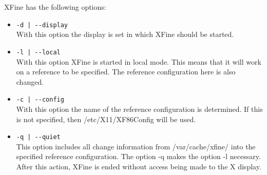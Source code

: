 XFine has the following options:
\begin{itemize}
\item \verb+-d | --display+\\
      With this option the display is set in which 
      XFine should be started.
\item \verb+-l | --local+\\
      With this option XFine is started in local mode.
      This means that it will work on a reference to be specified. The
      reference configuration here is also changed.
\item \verb+-c | --config+\\
      With this option the name of the reference configuration is determined. 
      If this is not specified, then /etc/X11/XF86Config will be used.
\item \verb+-q | --quiet+\\
      This option includes all change information from 
      /var/cache/xfine/ into the specified reference configuration. The
      option  -q makes the option -l necessary.
      After this action,  XFine is ended without access being made to the 
      X display.
\end{itemize}


